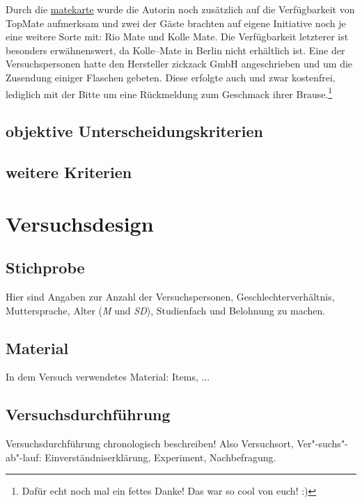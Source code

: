 \documentclass[11pt,a4paper,ngerman]{article}
\begin{document}
Durch die \href{http://www.matekarte.de/}{matekarte} wurde die Autorin noch zusätzlich auf die Verfügbarkeit von TopMate aufmerksam und zwei der Gäste brachten auf eigene Initiative noch je eine weitere Sorte mit: Rio Mate und Kolle Mate. Die Verfügbarkeit letzterer ist besonders erwähnenswert, da Kolle--Mate in Berlin nicht erhältlich ist. Eine der Versuchspersonen hatte den Hersteller zickzack GmbH angeschrieben und um die Zusendung einiger Flaschen gebeten. Diese erfolgte auch und zwar kostenfrei, lediglich mit der Bitte um eine Rückmeldung zum Geschmack ihrer Brause.\footnote{Dafür echt noch mal ein fettes Danke! Das war so cool von euch! :)\footnotemark}

\subsection{objektive Unterscheidungskriterien}


\subsection{weitere Kriterien}

\section{Versuchsdesign}


\subsection{Stichprobe}\label{sec:stichprobe}
Hier sind Angaben zur Anzahl der Versuchspersonen, Geschlechterverhältnis, Muttersprache, Alter (\textit{M} und \textit{SD}), Studienfach und Belohnung zu machen.



\subsection{Material} %
In dem Versuch verwendetes Material: Items, ... 



\subsection{Versuchsdurchführung} %
Versuchsdurchführung chronologisch beschreiben! Also Versuchsort, Ver"-suchs"-ab"-lauf: Einverständniserklärung, Experiment, Nachbefragung.
\end{document}
